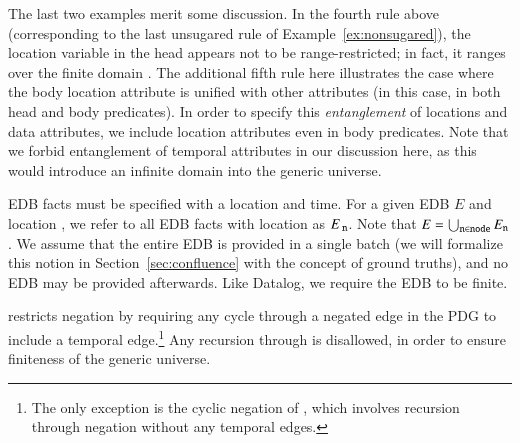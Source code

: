 The last two examples merit some discussion.  In the fourth rule above (corresponding to the last unsugared rule of Example~\ref{ex:nonsugared}), the location variable in the head appears not to be range-restricted; in fact, it ranges over the finite domain .  The additional fifth rule here illustrates the case where the body location attribute is unified with other attributes (in this case, in both head and body predicates).  In order to specify this \textit{entanglement} of locations and data attributes, we include location attributes even in body predicates. 
Note that we forbid entanglement of temporal attributes in our discussion here, as this would introduce an infinite domain into the generic universe.


\vspace{1em}
EDB facts must be specified with a location and time.  For a given EDB $E$ and location , we refer to all EDB facts with location  as $E_{\text{ \dedalus{{\scriptsize n}}}}$.  Note that $E = \bigcup_{\text{\dedalus{{\scriptsize n}}} \in \text{\dedalus{{\scriptsize node}}}} E_{\text{\dedalus{{\scriptsize n}}}}$.  We assume that the entire EDB is provided in a single batch
(we will formalize this notion in Section~\ref{sec:confluence} with the concept of
ground truths), and no EDB may be provided afterwards.  Like Datalog, we require the EDB to be finite.

\vspace{1em}
\lang restricts negation by requiring any cycle through a negated edge in the PDG to include a temporal edge.\footnote{The only exception is the cyclic negation of , which involves recursion through negation without any temporal edges.}  Any recursion through  is disallowed, in order to ensure finiteness of the generic universe.  



